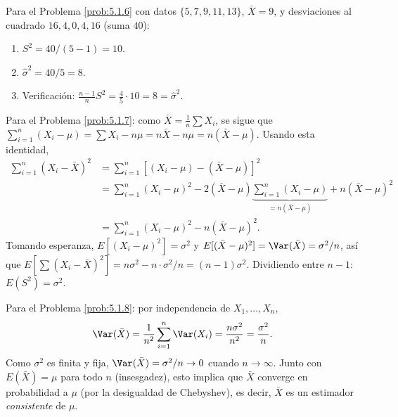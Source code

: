 \begin{solucion}
	\label{sol:5.1.6}
	Para el Problema \ref{prob:5.1.6} con datos $\{5,7,9,11,13\}$, $\bar{X}=9$, y desviaciones al cuadrado $16,4,0,4,16$ (suma $40$):
	\begin{enumerate}
		\item $S^{2} = 40/(5-1) = 10$.
		\item $\hat{\sigma}^{2} = 40/5 = 8$.
		\item Verificación: $\frac{n-1}{n}S^{2} = \frac{4}{5}\cdot 10 = 8 = \hat{\sigma}^{2}$. \quad \qedhere
	\end{enumerate}
\end{solucion}

\begin{solucion}
	\label{sol:5.1.7}
	Para el Problema \ref{prob:5.1.7}: como $\bar{X}=\frac{1}{n}\sum X_i$, se sigue que $\sum_{i=1}^n(X_i-\mu) = \sum X_i - n\mu = n\bar{X}-n\mu = n(\bar{X}-\mu)$. Usando esta identidad,
	\begin{align*}
		\sum_{i=1}^n(X_i-\bar X)^2 &= \sum_{i=1}^n\left[(X_i-\mu)-(\bar X-\mu)\right]^2 \\
		&= \sum_{i=1}^n(X_i-\mu)^2 - 2(\bar X-\mu)\underbrace{\sum_{i=1}^n(X_i-\mu)}_{=n(\bar X-\mu)} + n(\bar X-\mu)^2 \\
		&= \sum_{i=1}^n(X_i-\mu)^2 - n(\bar X-\mu)^2.
	\end{align*}
	Tomando esperanza, $E[(X_i-\mu)^2]=\sigma^2$ y $E[(\bar X-\mu)^2]=\Var(\bar X)=\sigma^2/n$, así que $E\left[\sum(X_i-\bar X)^2\right] = n\sigma^2 - n\cdot\sigma^2/n = (n-1)\sigma^2$. Dividiendo entre $n-1$: $E(S^2)=\sigma^2$. \quad \qedhere
\end{solucion}

\begin{solucion}
	\label{sol:5.1.8}
	Para el Problema \ref{prob:5.1.8}: por independencia de $X_1,\ldots,X_n$,
	\begin{align*}
		\Var(\bar X) = \frac{1}{n^2}\sum_{i=1}^n \Var(X_i) = \frac{n\sigma^2}{n^2} = \frac{\sigma^2}{n}.
	\end{align*}
	Como $\sigma^2$ es finita y fija, $\Var(\bar X) = \sigma^2/n \to 0$ cuando $n\to\infty$. Junto con $E(\bar X)=\mu$ para todo $n$ (insesgadez), esto implica que $\bar X$ converge en probabilidad a $\mu$ (por la desigualdad de Chebyshev), es decir, $\bar X$ es un estimador \emph{consistente} de $\mu$. \quad \qedhere
\end{solucion}

